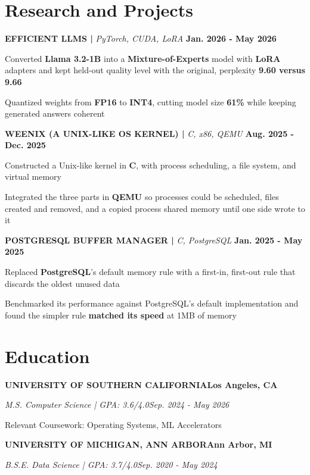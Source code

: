 \documentclass[10pt]{article}
\renewcommand{\note}[1]{#1\par}
\newcommand{\school}[4]{%
  \vspace{2pt}%
  \textbf{\MakeUppercase{#1}}\hfill\textbf{#2}\par
  \vspace{0.5pt}%
  \textit{#3}\hfill\textit{#4}\par
}
\newcommand{\proj}[4]{%
  \vspace{3pt}%
  \textbf{\MakeUppercase{#1} | }\textit{#2}\hfill
  \textbf{#4}%
  \notblank{#3}{\ \textbf{| #3}}{}%
  \par
}
\begin{document}
\section{Research and Projects}
\vspace{-3pt}
\proj{Efficient LLMs}{PyTorch, CUDA, LoRA}{USC}{Jan. 2026 - May 2026}
\begin{bullets}
  \item Converted \textbf{Llama 3.2-1B} into a \textbf{Mixture-of-Experts} model with \textbf{LoRA} adapters and kept held-out quality level with the original, perplexity \textbf{9.60 versus 9.66}
  \item Quantized weights from \textbf{FP16} to \textbf{INT4}, cutting model size \textbf{61\%} while keeping generated answers coherent
\end{bullets}

\proj{Weenix (A Unix-Like OS Kernel)}{C, x86, QEMU}{USC}{Aug. 2025 - Dec. 2025}
\begin{bullets}
  \item Constructed a Unix-like kernel in \textbf{C}, with process scheduling, a file system, and virtual memory
  \item Integrated the three parts in \textbf{QEMU} so processes could be scheduled, files created and removed, and a copied process shared memory until one side wrote to it
\end{bullets}

\proj{PostgreSQL Buffer Manager}{C, PostgreSQL}{USC}{Jan. 2025 - May 2025}
\begin{bullets}
  \item Replaced \textbf{PostgreSQL}'s default memory rule with a first-in, first-out rule that discards the oldest unused data
  \item Benchmarked its performance against PostgreSQL's default implementation and found the simpler rule \textbf{matched its speed} at 1MB of memory
\end{bullets}

\section{Education}
\vspace{-2pt}
\school{University of Southern California}{Los Angeles, CA}{M.S. Computer Science | GPA: 3.6/4.0}{Sep. 2024 - May 2026}
\note{Relevant Coursework: Operating Systems, ML Accelerators}

\school{University of Michigan, Ann Arbor}{Ann Arbor, MI}{B.S.E. Data Science | GPA: 3.7/4.0}{Sep. 2020 - May 2024}
\end{document}
